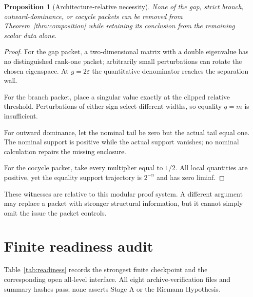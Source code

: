 \documentclass[12pt]{article}
\newtheorem{proposition}[theorem]{Proposition}
\begin{document}
\begin{proposition}[Architecture-relative necessity]\label{prop:witnesses}
None of the gap, strict branch, outward-dominance, or cocycle packets can be
removed from Theorem~\ref{thm:composition} while retaining its conclusion
from the remaining scalar data alone.
\end{proposition}
\begin{proof}
For the gap packet, a two-dimensional matrix with a double eigenvalue has no
distinguished rank-one packet; arbitrarily small perturbations can rotate the
chosen eigenspace.  At $g=2\varepsilon$ the quantitative denominator reaches
the separation wall.

For the branch packet, place a singular value exactly at the clipped relative
threshold.  Perturbations of either sign select different widths, so equality
$q=m$ is insufficient.

For outward dominance, let the nominal tail be zero but the actual tail
equal one.  The nominal support is positive while the actual support
vanishes; no nominal calculation repairs the missing enclosure.

For the cocycle packet, take every multiplier equal to $1/2$.  All local
quantities are positive, yet the equality support trajectory is $2^{-n}$ and
has zero liminf.
\end{proof}

These witnesses are relative to this modular proof system.  A different
argument may replace a packet with stronger structural information, but it
cannot simply omit the issue the packet controls.

\section{Finite readiness audit}
Table~\ref{tab:readiness} records the strongest finite checkpoint and the
corresponding open all-level interface.  All eight archive-verification files
and summary hashes pass; none asserts Stage A or the Riemann Hypothesis.
\end{document}
